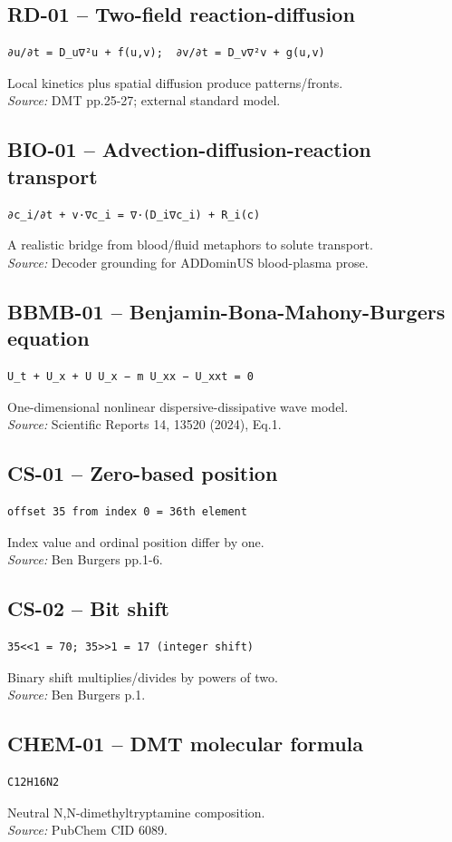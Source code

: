 \documentclass{article}
\begin{document}
\subsection*{RD-01 -- Two-field reaction-diffusion}
\begin{verbatim}
∂u/∂t = D_u∇²u + f(u,v);  ∂v/∂t = D_v∇²v + g(u,v)
\end{verbatim}
Local kinetics plus spatial diffusion produce patterns/fronts.\\
\textit{Source:} DMT pp.25-27; external standard model.
\subsection*{BIO-01 -- Advection-diffusion-reaction transport}
\begin{verbatim}
∂c_i/∂t + v·∇c_i = ∇·(D_i∇c_i) + R_i(c)
\end{verbatim}
A realistic bridge from blood/fluid metaphors to solute transport.\\
\textit{Source:} Decoder grounding for ADDominUS blood-plasma prose.
\subsection*{BBMB-01 -- Benjamin-Bona-Mahony-Burgers equation}
\begin{verbatim}
U_t + U_x + U U_x − m U_xx − U_xxt = 0
\end{verbatim}
One-dimensional nonlinear dispersive-dissipative wave model.\\
\textit{Source:} Scientific Reports 14, 13520 (2024), Eq.1.
\subsection*{CS-01 -- Zero-based position}
\begin{verbatim}
offset 35 from index 0 = 36th element
\end{verbatim}
Index value and ordinal position differ by one.\\
\textit{Source:} Ben Burgers pp.1-6.
\subsection*{CS-02 -- Bit shift}
\begin{verbatim}
35<<1 = 70; 35>>1 = 17 (integer shift)
\end{verbatim}
Binary shift multiplies/divides by powers of two.\\
\textit{Source:} Ben Burgers p.1.
\subsection*{CHEM-01 -- DMT molecular formula}
\begin{verbatim}
C12H16N2
\end{verbatim}
Neutral N,N-dimethyltryptamine composition.\\
\textit{Source:} PubChem CID 6089.
\end{document}
